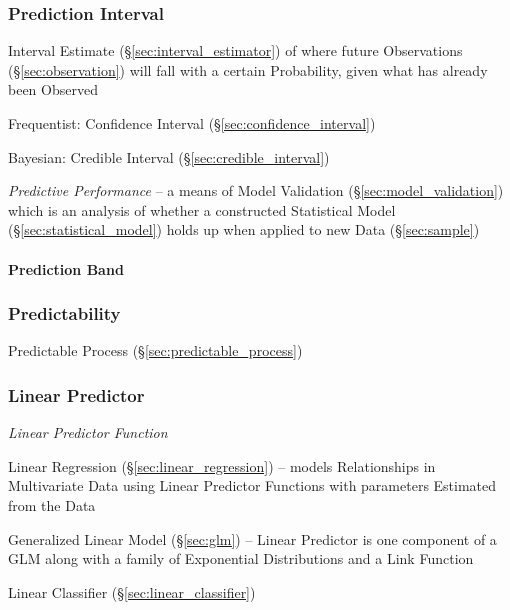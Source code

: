 \subsubsection{Prediction Interval}\label{sec:prediction_interval}\hfill

Interval Estimate (\S\ref{sec:interval_estimator}) of where future Observations
(\S\ref{sec:observation}) will fall with a certain Probability, given what has
already been Observed

Frequentist: Confidence Interval (\S\ref{sec:confidence_interval})

Bayesian: Credible Interval (\S\ref{sec:credible_interval})

\emph{Predictive Performance} -- a means of Model Validation
(\S\ref{sec:model_validation}) which is an analysis of whether a constructed
Statistical Model (\S\ref{sec:statistical_model}) holds up when applied to new
Data (\S\ref{sec:sample})



\paragraph{Prediction Band}\label{sec:prediction_band}\hfill



\subsubsection{Predictability}\label{sec:predictability}

\fist Predictable Process (\S\ref{sec:predictable_process})



\subsubsection{Linear Predictor}\label{sec:linear_predictor}

\emph{Linear Predictor Function}

\fist Linear Regression (\S\ref{sec:linear_regression}) -- models Relationships
in Multivariate Data using Linear Predictor Functions with parameters Estimated
from the Data

\fist Generalized Linear Model (\S\ref{sec:glm}) -- Linear Predictor is one
component of a GLM along with a family of Exponential Distributions and a Link
Function

\fist Linear Classifier (\S\ref{sec:linear_classifier})



